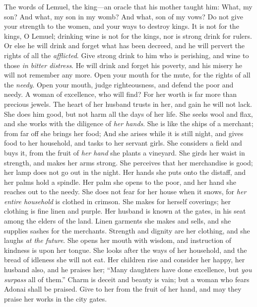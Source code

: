 \begin{biblechapter} %
 The words of Lemuel, the king—an oracle 
that his mother taught him:
\verse What, my son? And what, my son in my womb? 
And what, son of my vows?
\verse Do not give your strength to the women, 
and your ways to destroy kings.
\verse It is not for the kings, O Lemuel; 
drinking wine is not for the kings, 
nor is strong drink for rulers.
\verse Or else he will drink and forget what has been decreed, 
and he will pervert the rights of all the \textit{afflicted}.
\verse Give strong drink to him who is perishing, 
and wine to those \textit{in bitter distress}.
\verse He will drink and forget his poverty, 
and his misery he will not remember any more.
\verse Open your mouth for the mute, 
for the rights of all the \textit{needy}.
\verse Open your mouth, judge righteousness, 
and defend the poor and needy.
 A woman of excellence, who will find? 
For her worth is far more than precious jewels.
\verse The heart of her husband trusts in her, 
and gain he will not lack.
\verse She does him good, but not harm 
all the days of her life.
\verse She seeks wool and flax, 
and she works with the diligence of \textit{her hands}.
\verse She is like the ships of a merchant; 
from far off she brings her food;
\verse And she arises while it is still night, 
and gives food to her household, 
and tasks to her servant girls.
\verse She considers a field and buys it, 
from the fruit of \textit{her hand} she plants a vineyard.
\verse She girds her waist in strength, 
and makes her arms strong.
\verse She perceives that her merchandise is good; 
her lamp does not go out in the night.
\verse Her hands she puts onto the distaff, 
and her palms hold a spindle.
\verse Her palm she opens to the poor, 
and her hand she reaches out to the needy.
\verse She does not fear for her house when it snows, 
for \textit{her entire household} is clothed in crimson.
\verse She makes for herself coverings; 
her clothing is fine linen and purple.
\verse Her husband is known at the gates, 
in his seat among the elders of the land.
\verse Linen garments she makes and sells, 
and she supplies sashes for the merchants.
\verse Strength and dignity are her clothing, 
and she laughs \textit{at the future}.
\verse She opens her mouth with wisdom, 
and instruction of kindness is upon her tongue.
\verse She looks after the ways of her household, 
and the bread of idleness she will not eat.
\verse Her children rise and consider her happy, 
her husband also, and he praises her;
\verse “Many daughters have done excellence, 
but \textit{you surpass} all of them.”
\verse Charm is deceit and beauty is vain; 
but a woman who fears Adonai shall be praised.
\verse Give to her from the fruit of her hand, 
and may they praise her works in the city gates.
\end{biblechapter}

